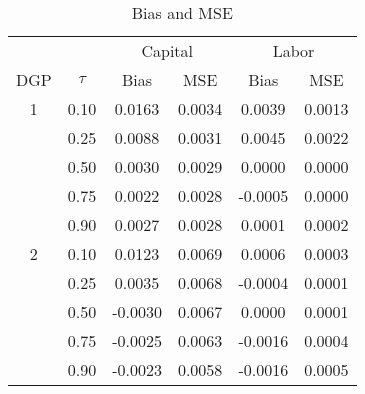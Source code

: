 \begin{table}[ht]
\centering
\caption{Bias and MSE} 
\begin{tabular}{cccccc}
  \hline\hline & & \multicolumn{2}{c}{Capital} & \multicolumn{2}{c}{Labor} \\ \cmidrule(lr){3-4} \cmidrule(lr){5-6}DGP & $\tau$ & Bias & MSE & Bias & MSE \\ 
  \hline
1 & 0.10 & 0.0163 & 0.0034 & 0.0039 & 0.0013 \\ 
   & 0.25 & 0.0088 & 0.0031 & 0.0045 & 0.0022 \\ 
   & 0.50 & 0.0030 & 0.0029 & 0.0000 & 0.0000 \\ 
   & 0.75 & 0.0022 & 0.0028 & -0.0005 & 0.0000 \\ 
   & 0.90 & 0.0027 & 0.0028 & 0.0001 & 0.0002 \\ 
  2 & 0.10 & 0.0123 & 0.0069 & 0.0006 & 0.0003 \\ 
   & 0.25 & 0.0035 & 0.0068 & -0.0004 & 0.0001 \\ 
   & 0.50 & -0.0030 & 0.0067 & 0.0000 & 0.0001 \\ 
   & 0.75 & -0.0025 & 0.0063 & -0.0016 & 0.0004 \\ 
   & 0.90 & -0.0023 & 0.0058 & -0.0016 & 0.0005 \\ 
   \hline
\end{tabular}
\end{table}
